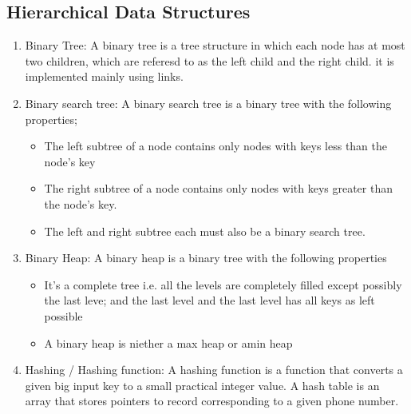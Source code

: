 \documentclass[11pt]{article} %
\begin{document}
	\subsection{Hierarchical Data Structures}
	\begin{enumerate}
	\item Binary Tree: A binary tree is a tree structure in which each node has at most two children, which are referesd to as the left child and the right child. it is implemented mainly using links.
	\item Binary search tree: A binary search tree is a binary tree with the following properties;
		\begin{itemize}
			\item The left subtree of a node contains only nodes with keys less than the node\rq{}s key
			\item The right subtree of a node contains only nodes with keys greater than the node\rq{}s key.
			\item The left and right subtree each must also be a binary search tree.
		\end{itemize}
	\item Binary Heap: A binary heap is a binary tree with the following properties
	\begin{itemize}
		\item It\rq{}s a complete tree i.e. all the levels are completely filled except possibly the last leve; and the last level and the last level has all keys as left possible
		\item A binary heap is niether a max heap or amin heap
	\end{itemize}
	 \item Hashing / Hashing function: A hashing function is a function that converts a given big input key to a small practical integer value. A hash table is an array that stores pointers to record corresponding to a given phone number.
	\end{enumerate}
\end{document}
